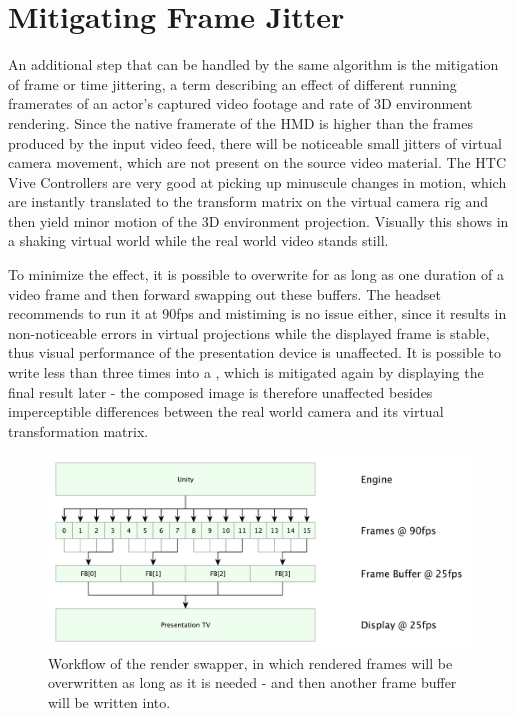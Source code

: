 %
\newpage
\section{Mitigating Frame Jitter}
\label{sec:framejitter}

An additional step that can be handled by the same algorithm is the mitigation 
of frame or time jittering, a term describing an effect of different running 
framerates of an actor's captured video footage and rate of 3D environment 
rendering. Since the native framerate of the HMD is higher than the frames 
produced by the input video feed, there will be noticeable small jitters of 
virtual camera movement, which are not present on the source video material. 
The HTC Vive Controllers are very good at picking up minuscule changes in 
motion, which are instantly translated to the transform matrix on the virtual 
camera rig and then yield minor motion of the 3D environment projection. 
Visually this shows in a shaking virtual world while the real world video 
stands still.

To minimize the effect, it is possible to overwrite  for 
as long as one duration of a video frame and then forward swapping out these 
buffers. The headset recommends to run it at 90fps and mistiming is no 
issue either, since it results in non-noticeable errors in virtual projections 
while the displayed frame is stable, thus visual performance of the 
presentation device is unaffected. It is possible to write less than three 
times into a , which is mitigated again by displaying the 
final result later - the composed image is therefore unaffected besides 
imperceptible differences between the real world camera and its virtual 
transformation matrix.

\begin{figure}[htb]
	\centering
	\includegraphics[width=\textwidth]{gfx/Delay_Mitigation.pdf}
	\caption{Workflow of the render swapper, in which rendered frames will be 
		overwritten as long as it is needed - and then another frame buffer 
		will be 
		written into.}
	\label{fig:offsets:framesquashing}
\end{figure}
